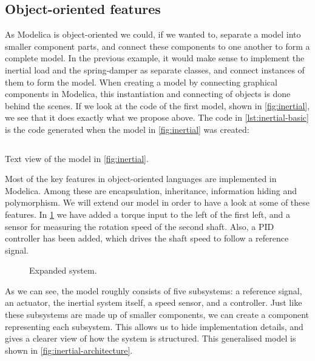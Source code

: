 \documentclass[\rootfolder/main.tex]{subfiles}
\begin{document}
\subsection{Object-oriented features}

As Modelica is object-oriented we could, if we wanted to, separate a model into smaller component parts, and connect these components to one another to form a complete model.
In the previous example, it would make sense to implement the inertial load and the spring-damper as separate classes, and connect instances of them to form the model.
When creating a model by connecting graphical components in Modelica, this instantiation and connecting of objects is done behind the scenes.
If we look at the code of the first model, shown in \cref{fig:inertial}, we see that it does exactly what we propose above.
The code in \cref{lst:inertial-basic} is the code generated when the model in \cref{fig:inertial} was created\footnotemark:


\begin{listing}[ht]
    \inputminted[fontsize=\footnotesize]{Modelica}{\rootfolder/Models/MasterProject/Models/InertialBasic2.mo}
    \caption{Text view of the model in \cref{fig:inertial}.\label{lst:inertial-basic}}
\end{listing}

Most of the key features in object-oriented languages are implemented in Modelica.
Among these are encapsulation, inheritance, information hiding and polymorphism.
We will extend our model in order to have a look at some of these features.
In \cref{fig:inertial-expanded} we have added a torque input to the left of the first left, and a sensor for measuring the rotation speed of the second shaft.
Also, a PID controller has been added, which drives the shaft speed to follow a reference signal.

\begin{figure}[ht]
    \caption{Expanded system.\label{fig:inertial-expanded}}
\end{figure}

As we can see, the model roughly consists of five subsystems: a reference signal, an actuator, the inertial system itself, a speed sensor, and a controller.
Just like these subsystems are made up of smaller components, we can create a component representing each subsystem.
This allows us to hide implementation details, and gives a clearer view of how the system is structured.
This generalised model is shown in \cref{fig:inertial-architecture}.
\end{document}
